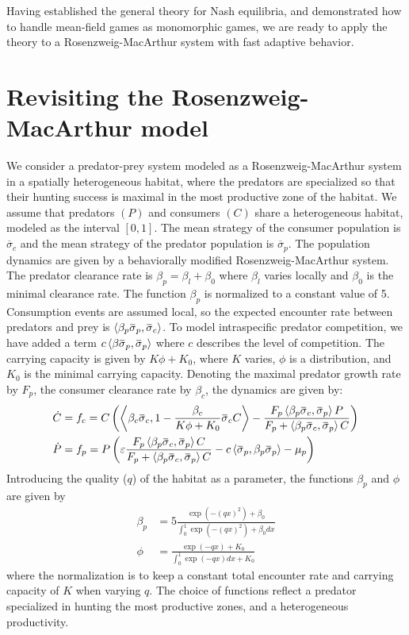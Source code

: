 Having established the general theory for Nash equilibria, and demonstrated how to handle mean-field games as monomorphic games, we are ready to apply the theory to a Rosenzweig-MacArthur system with fast adaptive behavior.
\section{Revisiting the Rosenzweig-MacArthur model}
\label{sec:model_rm}
We consider a predator-prey system modeled as a Rosenzweig-MacArthur system in a spatially heterogeneous habitat, where the predators are specialized so that their hunting success is maximal in the most productive zone of the habitat.
We assume that predators $(P)$ and consumers $(C)$ share a heterogeneous habitat, modeled as the interval $[0,1]$. The mean strategy of the consumer population is $\overbar{\sigma}_c$ and the mean strategy of the predator population is $\overbar{\sigma}_p$.
The population dynamics are given by a behaviorally modified Rosenzweig-MacArthur system. The predator clearance rate is $\beta_p = \beta_{l} + \beta_0$ where $\beta_l$ varies locally and $\beta_0$ is the minimal clearance rate. The function $\beta_p$ is normalized to a constant value of 5.
Consumption events are assumed local, so the expected encounter rate between predators and prey is $\ip{\beta_p \overbar{\sigma}_p}{\overbar{\sigma}_c}$. To model intraspecific predator competition, we have added a term $c\ip{\beta \overbar{\sigma}_p}{\overbar{\sigma}_p}$ where $c$ describes the level of competition. The carrying capacity is given by $K\phi + K_0$,
 where $K$ varies, $\phi$ is a distribution, and $K_0$ is the minimal carrying capacity. Denoting the maximal predator growth rate by $F_p$, the consumer clearance rate by $\beta_c$, the dynamics are given by:
\begin{align}
  \dot{C} &= f_c = C \pa{\ip{\beta_c \overbar{\sigma}_c}{1-\frac{\beta_c}{K\phi + K_0}\overbar{\sigma}_c C} - \frac{F_p \ip{\beta_p \overbar{\sigma}_c}{\overbar{\sigma}_p} P}{F_p + \ip{\beta_p \overbar{\sigma}_c}{\overbar{\sigma}_p} C} } \\
  \dot{P} &= f_p = P \pa{\epsilon \frac{F_p \ip{\beta_p \overbar{\sigma}_c}{\overbar{\sigma}_p} C}{F_p + \ip{\beta_p \overbar{\sigma}_c}{\overbar{\sigma}_p} C} - c \ip{\overbar{\sigma}_p}{\beta_p \overbar{\sigma}_p}  - \mu_p}
  \label{eq:dynamics}
\end{align}
Introducing the quality ($q$) of the habitat as a parameter, the functions $\beta_p$ and $\phi$ are given by
\begin{align}
  \beta_p &= 5 \frac{\exp(-(q x)^2) + \beta_0}{\int_0^1 \exp(-(q x)^2) + \beta_0 dx} \\
  \phi &= \frac{\exp(-q x) + K_0}{\int_0^1 \exp(-q x) dx + K_0 }
\end{align}
where the normalization is to keep a constant total encounter rate and carrying capacity of $K$ when varying $q$. The choice of functions reflect a predator specialized in hunting the most productive zones, and a heterogeneous productivity.

